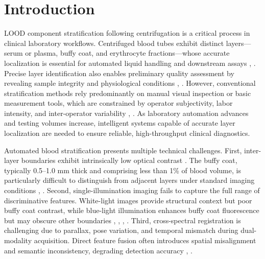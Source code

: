 \section{Introduction}
\label{sec:introduction}
LOOD component stratification following centrifugation is a critical process in clinical laboratory workflows. Centrifuged blood tubes exhibit distinct layers—serum or plasma, buffy coat, and erythrocyte fractions—whose accurate localization is essential for automated liquid handling and downstream assays \cite{blood_component_1}, \cite{blood_component_2}. Precise layer identification also enables preliminary quality assessment by revealing sample integrity and physiological conditions \cite{automation_1}, \cite{automation_2}. However, conventional stratification methods rely predominantly on manual visual inspection or basic measurement tools, which are constrained by operator subjectivity, labor intensity, and inter-operator variability \cite{manual_prob_1}, \cite{manual_prob_2}. As laboratory automation advances and testing volumes increase, intelligent systems capable of accurate layer localization are needed to ensure reliable, high-throughput clinical diagnostics.

Automated blood stratification presents multiple technical challenges. First, inter-layer boundaries exhibit intrinsically low optical contrast \cite{diff_1}. The buffy coat, typically 0.5–1.0 mm thick and comprising less than 1\% of blood volume, is particularly difficult to distinguish from adjacent layers under standard imaging conditions \cite{diff_2}, \cite{diff_3}. Second, single-illumination imaging fails to capture the full range of discriminative features. White-light images provide structural context but poor buffy coat contrast, while blue-light illumination enhances buffy coat fluorescence but may obscure other boundaries \cite{blue_1}, \cite{blue_2}, \cite{blue_3}, \cite{blue_4}. Third, cross-spectral registration is challenging due to parallax, pose variation, and temporal mismatch during dual-modality acquisition. Direct feature fusion often introduces spatial misalignment and semantic inconsistency, degrading detection accuracy \cite{diff_cross_1}, \cite{diff_cross_2}.

